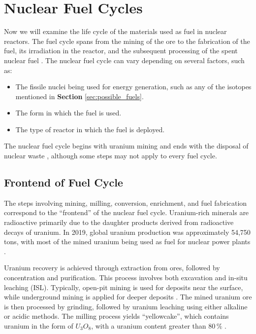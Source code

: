 \chapter{Nuclear Fuel Cycles}

Now we will examine the life cycle of the materials used as fuel in nuclear reactors. The fuel cycle spans from the mining of the ore to the fabrication of the fuel, its irradiation in the reactor, and the subsequent processing of the spent nuclear fuel \cite{fuel_cycle_book}. The nuclear fuel cycle can vary depending on several factors, such as:

\begin{itemize}
    \item The fissile nuclei being used for energy generation, such as any of the isotopes mentioned in \textbf{Section} \ref{sec:possible_fuels}.
    \item The form in which the fuel is used.
    \item The type of reactor in which the fuel is deployed.
\end{itemize}

The nuclear fuel cycle begins with uranium mining and ends with the disposal of nuclear waste \cite{fuel_cycle_book}, although some steps may not apply to every fuel cycle.

\section{Frontend of Fuel Cycle}

The steps involving mining, milling, conversion, enrichment, and fuel fabrication correspond to the ``frontend'' of the nuclear fuel cycle. Uranium-rich minerals are radioactive primarily due to the daughter products derived from radioactive decays of uranium. In 2019, global uranium production was approximately 54,750 tons, with most of the mined uranium being used as fuel for nuclear power plants \cite{fuel_cycle_book}.

Uranium recovery is achieved through extraction from ores, followed by concentration and purification. This process involves both excavation and in-situ leaching (ISL). Typically, open-pit mining is used for deposits near the surface, while underground mining is applied for deeper deposits \cite{fuel_cycle_book}. The mined uranium ore is then processed by grinding, followed by uranium leaching using either alkaline or acidic methods. The milling process yields ``yellowcake'', which contains uranium in the form of \(U_3O_8\), with a uranium content greater than \(80 \, \%\) \cite{fuel_cycle_book}.

